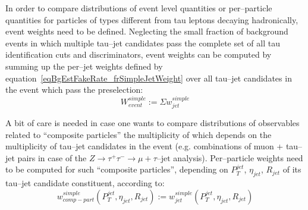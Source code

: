 In order to compare distributions of event level quantities or per--particle quantities for 
particles of types different from tau leptons decaying hadronically, event weights need to be defined.
Neglecting the small fraction of background events in which multiple tau--jet candidates pass the complete set 
of all tau identification cuts and discriminators, 
event weights can be computed by summing up the per--jet weights defined by equation~\ref{eqBgEstFakeRate_frSimpleJetWeight}
over all tau--jet candidates in the event which pass the preselection:
\begin{equation}
W_{event}^{simple} := \Sigma w_{jet}^{simple}
\label{eqBgEstFakeRate_frSimpleEventWeight}
\end{equation}

A bit of care is needed in case one wants to compare distributions of observables related to ``composite particles'' 
the multiplicity of which depends on the multiplicity of tau--jet candidates in the event 
(e.g. combinations of muon + tau--jet pairs in case of the $Z \rightarrow \tau^{+} \tau^{-} \rightarrow \mu + \tau\mbox{--jet}$ analysis).
Per--particle weights need to be computed for such ``composite particles'', 
depending on $P_{T}^{jet}$, $\eta_{jet}$, $R_{jet}$ of its tau--jet candidate constituent, 
according to:
\begin{equation}
w_{comp-part}^{simple} \left( P_{T}^{jet}, \eta_{jet}, R_{jet} \right) := 
  w_{jet}^{simple} \left( P_{T}^{jet}, \eta_{jet}, R_{jet} \right)
\label{eqBgEstFakeRate_frSimpleCompositeParticleWeight}
\end{equation}

